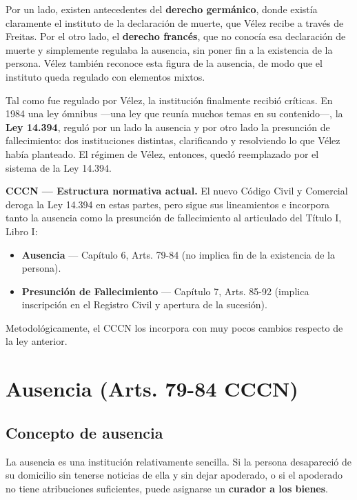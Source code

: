 \documentclass[12pt,oneside]{book}
\begin{document}
Por un lado, existen antecedentes del \textbf{derecho germánico}, donde
existía claramente el instituto de la declaración de muerte, que Vélez
recibe a través de Freitas. Por el otro lado, el \textbf{derecho
francés}, que no conocía esa declaración de muerte y simplemente regulaba
la ausencia, sin poner fin a la existencia de la persona. Vélez también
reconoce esta figura de la ausencia, de modo que el instituto queda
regulado con elementos mixtos.

Tal como fue regulado por Vélez, la institución finalmente recibió
críticas. En 1984 una ley ómnibus —una ley que reunía muchos temas en su
contenido—, la \textbf{Ley 14.394}, reguló por un lado la ausencia y por
otro lado la presunción de fallecimiento: dos instituciones distintas,
clarificando y resolviendo lo que Vélez había planteado. El régimen de
Vélez, entonces, quedó reemplazado por el sistema de la Ley 14.394.

\begin{important}
\textbf{CCCN — Estructura normativa actual.} El nuevo Código Civil y
Comercial deroga la Ley 14.394 en estas partes, pero sigue sus
lineamientos e incorpora tanto la ausencia como la presunción de
fallecimiento al articulado del Título I, Libro I:
\begin{itemize}
    \item \textbf{Ausencia} — Capítulo 6, Arts. 79-84 (no implica fin de la existencia de la persona).
    \item \textbf{Presunción de Fallecimiento} — Capítulo 7, Arts. 85-92 (implica inscripción en el Registro Civil y apertura de la sucesión).
\end{itemize}
Metodológicamente, el CCCN los incorpora con muy pocos cambios respecto de
la ley anterior.
\end{important}

\chapter{Ausencia (Arts. 79-84 CCCN)}

\section{Concepto de ausencia}

La ausencia es una institución relativamente sencilla. Si la persona
desapareció de su domicilio sin tenerse noticias de ella y sin dejar
apoderado, o si el apoderado no tiene atribuciones suficientes, puede
asignarse un \textbf{curador a los bienes}.
\end{document}
